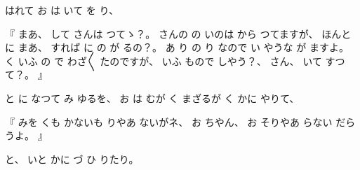 %
はれて
お
は
いて
を
り、

%
『
まあ、
%
して
さんは
つてゝ？。
%
さんの
%
の
いのは
から
つてますが、
%
ほんとに
まあ、
%
すれば
に
の
が
るの？。
%
あ
り
の
り
なので
い
やうな
が
ますよ。
%
く
いふ
の
で
わざ〳〵
たのですが、
いふ
もので
しやう？、
%
さん、
%
いて
すつて？。
』

%
と
に
なつて
み
ゆるを、
%
お
は
むが
く
まざるが
く
かに
やりて、

%
『
みを
くも
かないも
りやあ
ないがネ、
%
お
ちやん、
%
お
そりやあ
らない
だらうよ。
』

%
と、
%
いと
かに
づ
ひ
りたり。
